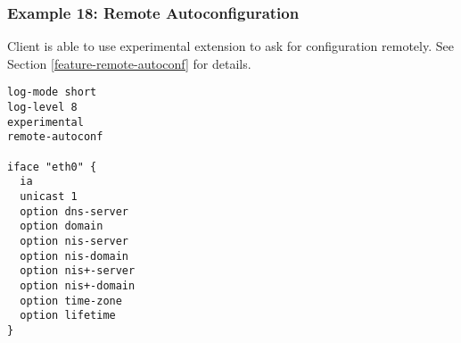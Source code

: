 \subsubsection{Example 18: Remote Autoconfiguration}
Client is able to use experimental extension to ask for configuration
remotely. See Section \ref{feature-remote-autoconf} for details.

\begin{lstlisting}
log-mode short
log-level 8
experimental
remote-autoconf

iface "eth0" {
  ia
  unicast 1
  option dns-server
  option domain
  option nis-server
  option nis-domain
  option nis+-server
  option nis+-domain
  option time-zone
  option lifetime
}
\end{lstlisting}
